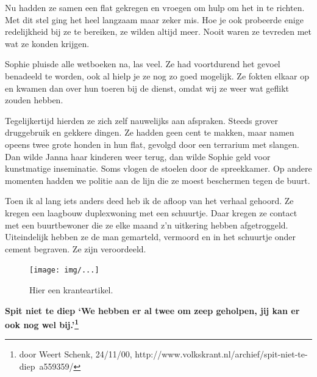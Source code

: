 \documentclass[12pt,twoside]{memoir}
\begin{document}
Nu hadden ze samen een flat gekregen en vroegen om hulp om het in te richten. Met dit stel ging het heel langzaam maar zeker mis. Hoe je ook probeerde enige redelijkheid bij ze te bereiken, ze wilden altijd meer. Nooit waren ze tevreden met wat ze konden krijgen. 

Sophie pluisde alle wetboeken na, las veel. Ze had voortdurend het gevoel benadeeld te worden, ook al hielp je ze nog zo goed mogelijk. Ze fokten elkaar op en kwamen dan over hun toeren bij de dienst, omdat wij ze weer wat geflikt zouden hebben. 

Tegelijkertijd hierden ze zich zelf nauwelijks aan afspraken. Steeds grover druggebruik en gekkere dingen. Ze hadden geen cent te makken, maar namen opeens twee grote honden in hun flat, gevolgd door een terrarium met slangen. Dan wilde Janna haar kinderen weer terug, dan wilde Sophie geld voor kunstmatige inseminatie. Soms vlogen de stoelen door de spreekkamer. Op andere momenten hadden we politie aan de lijn die ze moest beschermen tegen de buurt. 

Toen ik al lang iets anders deed heb ik de afloop van het verhaal gehoord. Ze kregen een laagbouw duplexwoning met een schuurtje. Daar kregen ze contact met een buurtbewoner die ze elke maand z'n uitkering hebben afgetroggeld. Uiteindelijk hebben ze de man gemarteld, vermoord en in het schuurtje onder cement begraven. Ze zijn veroordeeld. 

\begin{figure}[t]
\texttt{[image: img/...]}
\caption{Hier een kranteartikel.}
\end{figure}

\textbf{Spit niet te diep
`We hebben er al twee om zeep geholpen, jij kan er ook nog wel bij.'\footnote{door Weert Schenk, 24/11/00, http://www.volkskrant.nl/archief/spit-niet-te-diep~a559359/}}


\end{document}
